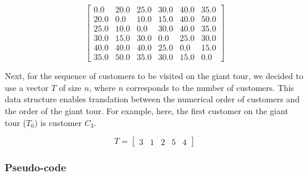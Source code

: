 \begin{displaymath}
\begin{bmatrix}
0.0	& 20.0	 & 25.0 	& 30.0 	& 40.0 	& 35.0 \\
20.0	& 0.0 	 & 10.0 	& 15.0 	& 40.0 	& 50.0 \\
25.0	& 10.0	 & 0.0 	& 30.0 	& 40.0 	& 35.0 \\
30.0	& 15.0	 & 30.0 	& 0.0 	& 25.0 	& 30.0 \\
40.0	& 40.0	 & 40.0 	& 25.0 	& 0.0 	& 15.0 \\
35.0	& 50.0	 & 35.0	& 30.0 	& 15.0 	& 0.0
\end{bmatrix}
\end{displaymath}

\vspace*{5cm}
Next, for the sequence of customers to be visited on the giant tour, we decided to use a vector $T$ of size $n$, where $n$ corresponds to the number of customers. This data structure enables translation between the numerical order of customers and the order of the giant tour. For example, here, the first customer on the giant tour ($T_0$) is customer $C_3$.

\begin{displaymath}
T = \begin{bmatrix}
3 & 1 & 2 & 5 & 4
\end{bmatrix}
\end{displaymath}

\subsubsection{Pseudo-code}

